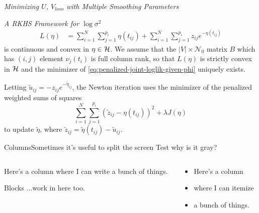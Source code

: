 \begin{frame}{\textit{Minimizing $U$, $V_{loso}$ with Multiple Smoothing Parameters}}{}

\end{frame}


\begin{frame}{\textit{A RKHS Framework for $\log \sigma^2$}}
\begin{align}  \label{eq:penalized-likelihood-functional}
L\left( \eta \right) &= \sum_{i = 1}^N \sum_{j = 1}^{p_i} \eta\left(t_{ij}\right)  + \sum_{i = 1}^N \sum_{j = 1}^{p_i} z_{ij} e^{-\eta\left(t_{ij}\right)} 
\end{align}
\noindent
is continuous and convex in $\eta \in \mathcal{H}$. We assume that the $\vert V \vert \times \mathcal{N}_0$ matrix $B$ which has $\left(i,j\right)$ element $\nu_j\left(t_i\right)$ is full column rank, so that $L\left(\eta \right)$ is strictly convex in $\mathcal{H}$ and the minimizer of \eqref{eq:penalized-joint-loglik-given-phi} uniquely exists.  

Letting $\tilde{u}_{ij} = -z_{ij}e^{-\tilde{\eta}_{ij}}$, the Newton iteration uses the minimizer of the penalized weighted sums of squares
\begin{equation} \label{eq:penalized-weighted-sums-of-squares}
\sum_{i=1}^N\sum_{j=1}^{p_i} \left(\tilde{z}_{ij} - \eta\left(t_{ij}\right)  \right)^2 + \lambda J\left(\eta\right)
\end{equation}
\noindent
to update $\tilde{\eta}$, where $\tilde{z}_{ij} = \tilde{\eta}\left(t_{ij}\right) - \tilde{u}_{ij}$.


\end{frame}


\begin{frame}[c]{Columns}{Sometimes it's useful to split the screen}
	Test why is it gray?
	
	\begin{columns}[t]
	\begin{column}[T]{5cm}
		Here's a column where I can write a bunch of things. \\
		
		\vspace{1em}
		\begin{block}{Blocks}
			...work in here too.
		\end{block}
	\end{column}
	\begin{column}[T]{5cm}
		\begin{itemize}
			\item Here's a column
			\item where I can itemize
			\item a bunch of things.
		\end{itemize}
	\end{column}
	\end{columns}
	
\end{frame}


